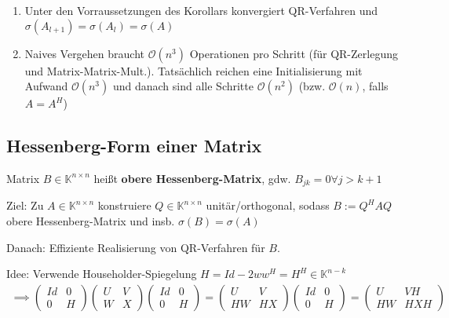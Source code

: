 \begin{remark}
	\begin{enumerate}
		\item Unter den Vorraussetzungen des Korollars konvergiert QR-Verfahren und $\sigma(A_{l+1}) = \sigma(A_l) = \sigma(A)$
		\item Naives Vergehen braucht $\mathcal{O}(n^3)$ Operationen pro Schritt (für QR-Zerlegung und Matrix-Matrix-Mult.). Tatsächlich reichen eine Initialisierung mit Aufwand $\mathcal{O}(n^3)$ und danach sind alle Schritte $\mathcal{O}(n^2)$ (bzw. $\mathcal{O}(n)$, falls $A=A^H$)
	\end{enumerate}
\end{remark}

\subsection{Hessenberg-Form einer Matrix}

\begin{definition}
	Matrix $B \in \mathbb{K}^{n\times n}$ heißt \textbf{obere Hessenberg-Matrix}, gdw. $B_{jk} = 0 \forall j > k+1$
\end{definition}

Ziel: Zu $A \in \mathbb{K}^{n\times n}$ konstruiere $Q \in \mathbb{K}^{n\times n}$ unitär/orthogonal, sodass $B := Q^HAQ$ obere Hessenberg-Matrix und insb. $\sigma(B) = \sigma(A)$

Danach: Effiziente Realisierung von QR-Verfahren für $B$.

Idee: Verwende Householder-Spiegelung $H = Id - 2ww^H = H^H \in \mathbb{K}^{n-k}$
\begin{align*}
	\implies \left(\begin{matrix}
		Id & 0\\
		0 & H
	\end{matrix}\right) \left(\begin{matrix}
		U & V\\
		W & X
	\end{matrix}\right) \left(\begin{matrix}
		Id & 0\\
		0 & H
	\end{matrix}\right) = \left(\begin{matrix}
		U & V\\
		HW & HX
	\end{matrix}\right) \left(\begin{matrix}
		Id & 0\\
		0 & H
	\end{matrix}\right) = \left(\begin{matrix}
	U & VH\\
	HW & HXH
	\end{matrix}\right)
\end{align*}

